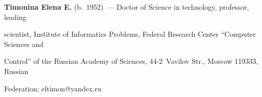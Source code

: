  


\noindent


\textbf{Timonina Elena E.} (b.\ 1952)~--- Doctor of Science in technology, professor, leading 


scientist, Institute of Informatics Problems, Federal Research Center ``Computer Sciences and 


Control'' of the Russian Academy of Sciences, 44-2~Vavilov Str., Moscow 119333, Russian 


Federation; \mbox{eltimon@yandex.ru} 





\label{end\stat}








\renewcommand{\bibname}{\protect\rm Литература}


